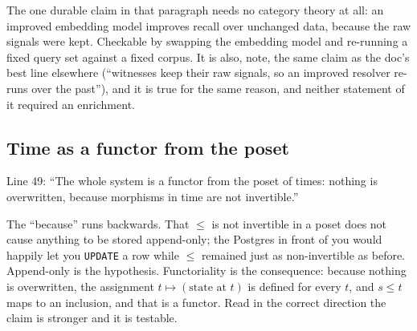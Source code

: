 The one durable claim in that paragraph needs no category theory at all: an improved embedding model improves recall over unchanged data, because the raw signals were kept.  Checkable by swapping the embedding model and re-running a fixed query set against a fixed corpus. It is also, note, the same claim as the doc's best line elsewhere (``witnesses keep their raw signals, so an improved resolver re-runs over the past''), and it is true for the same reason, and neither statement of it required an enrichment.

\subsection*{Time as a functor from the poset}

Line 49: ``The whole system is a functor from the poset of times: nothing is overwritten, because morphisms in time are not invertible.''

The ``because'' runs backwards. That $\leq$ is not invertible in a poset does not cause anything to be stored append-only; the Postgres in front of you would happily let you \verb|UPDATE| a row while $\leq$ remained just as non-invertible as before. Append-only is the hypothesis. Functoriality is the consequence: because nothing is overwritten, the assignment $t \mapsto (\text{state at } t)$ is defined for every $t$, and $s \leq t$ maps to an inclusion, and that is a functor. Read in the correct direction the claim is stronger and it is testable.

